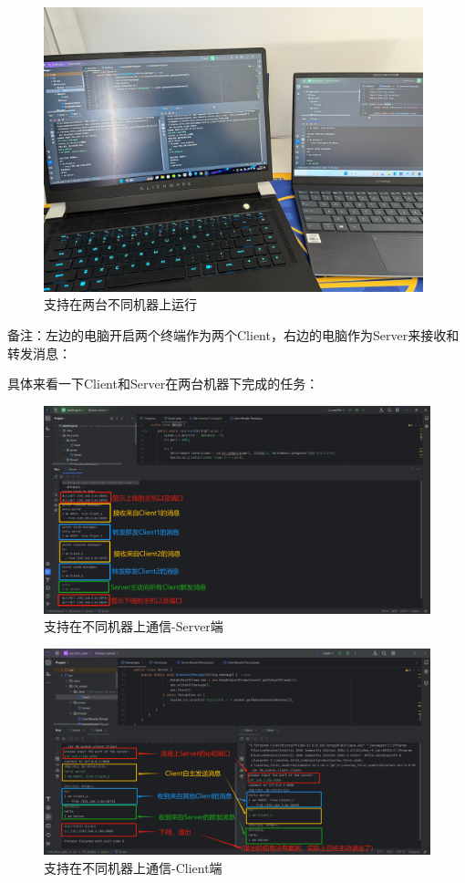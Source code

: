 \documentclass{article}
\begin{document}
	\begin{figure}[H]
		\centering
		\includegraphics[width=11cm]{./images/7.支持在localhost及两台不同机器上运行.jpg}
		\caption{支持在两台不同机器上运行}
	\end{figure}
	
	备注：左边的电脑开启两个终端作为两个Client，右边的电脑作为Server来接收和转发消息：
	
	具体来看一下Client和Server在两台机器下完成的任务：
	
	\begin{figure}[H]
		\centering
		\includegraphics[width=15cm]{./images/7.支持在不同机器上通信-Server端.png}
		\caption{支持在不同机器上通信-Server端}
	\end{figure}
	
	\begin{figure}[H]
		\centering
		\includegraphics[width=15cm]{./images/7.支持在不同机器上通信-Client端.png}
		\caption{支持在不同机器上通信-Client端}
	\end{figure}
	
\end{document}
